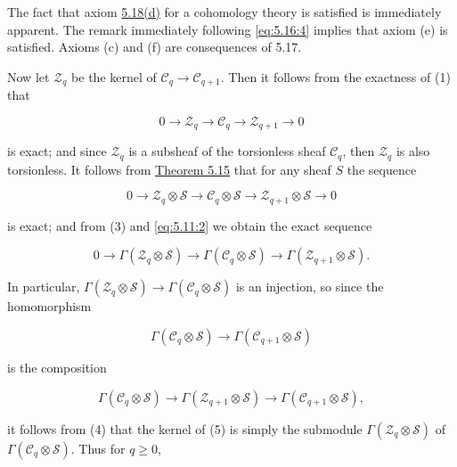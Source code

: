 The fact that axiom \hyperref[thm:5.18]{5.18(d)} for a cohomology theory is satisfied is immediately apparent. The remark immediately following \eqref{eq:5.16:4} implies that axiom (e) is satisfied. Axioms (c) and (f) are consequences of 5.17.

Now let $\mathcal{Z}_{q}$ be the kernel of $\mathcal{C}_{q}\to\mathcal{C}_{q+1}$. Then it follows from the exactness of (1) that

\begin{equation}
\tag{2}\label{eq:5.20:2}
0\to\mathcal{Z}_{q}\to\mathcal{C}_{q}\to\mathcal{Z}_{q+1}\to0
\end{equation}

is exact; and since $\mathcal{Z}_{q}$ is a subsheaf of the torsionless sheaf $\mathcal{C}_{q}$, then $\mathcal{Z}_{q}$ is also torsionless. It follows from \hyperref[thm:5.15]{Theorem 5.15} that for any sheaf $S$ the sequence

\begin{equation}
\tag{3}\label{eq:5.20:3}
0\to\mathcal{Z}_{q}\otimes\mathcal{S}\to\mathcal{C}_{q}\otimes\mathcal{S}\to\mathcal{Z}_{q+1}\otimes\mathcal{S}\to0
\end{equation}

is exact; and from (3) and \eqref{eq:5.11:2} we obtain the exact sequence

\begin{equation}
\tag{4}\label{eq:5.20:4}
0\to\Gamma(\mathcal{Z}_{q}\otimes\mathcal{S})\to\Gamma(\mathcal{C}_{q}\otimes\mathcal{S})\to\Gamma(\mathcal{Z}_{q+1}\otimes\mathcal{S}).
\end{equation}

In particular,  $ \Gamma(\mathcal{Z}_q \otimes \mathcal{S}) \to \Gamma(\mathcal{C}_q \otimes \mathcal{S}) $ is an injection, so since the homomorphism

\begin{equation}
\tag{5}\label{eq:5.20:5}
\Gamma(\mathcal{C}_{q}\otimes\mathcal{S})\to\Gamma(\mathcal{C}_{q+1}\otimes\mathcal{S})
\end{equation}

is the composition

\begin{equation}
\tag{6}\label{eq:5.20:6}
\Gamma(\mathcal{C}_{q}\otimes\mathcal{S})\to\Gamma(\mathcal{Z}_{q+1}\otimes\mathcal{S})\to\Gamma(\mathcal{C}_{q+1}\otimes\mathcal{S}),
\end{equation}

it follows from (4) that the kernel of (5) is simply the submodule $\Gamma(\mathcal{Z}_q \otimes \mathcal{S})$ of $\Gamma(\mathcal{C}_q \otimes \mathcal{S})$. Thus for  $ q \geq 0 $,

